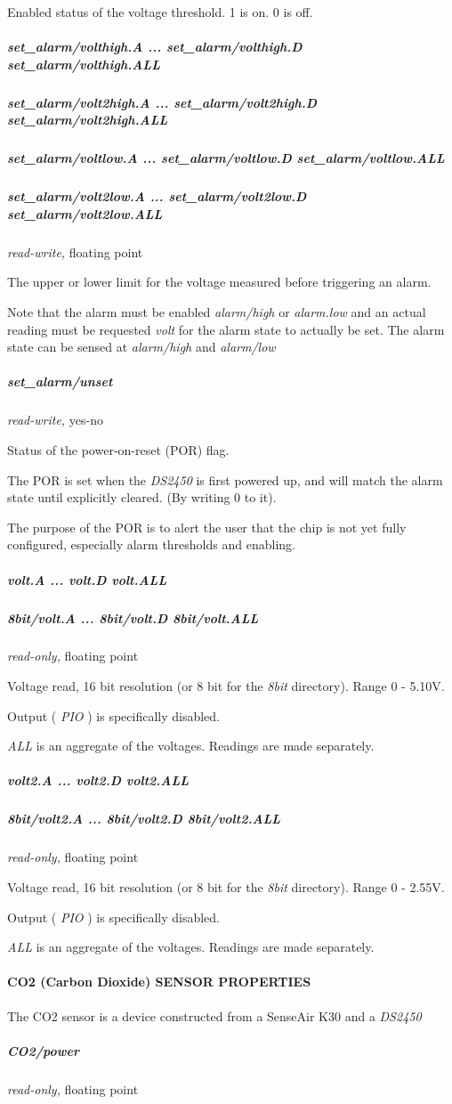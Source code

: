 Enabled status of the voltage threshold. 1 is on. 0 is off. 
\subparagraph*{set\_alarm/volthigh.A
... set\_alarm/volthigh.D set\_alarm/volthigh.ALL}
\subparagraph*{set\_alarm/volt2high.A ... set\_alarm/volt2high.D
set\_alarm/volt2high.ALL}
\subparagraph*{set\_alarm/voltlow.A ... set\_alarm/voltlow.D set\_alarm/voltlow.ALL}
\subparagraph*{set\_alarm/volt2low.A
... set\_alarm/volt2low.D set\_alarm/volt2low.ALL}\textit{read-write,} floating point 

The upper or lower limit for the voltage measured before triggering an
alarm. 

Note that the alarm must be enabled \textit{alarm/high} or \textit{alarm.low} and an actual
reading must be requested \textit{volt} for the alarm state to actually be set. The
alarm state can be sensed at \textit{alarm/high} and \textit{alarm/low} 
\subparagraph*{set\_alarm/unset}\textit{read-write,}
yes-no 

Status of the power-on-reset (POR) flag. 

The POR is set when the \textit{DS2450} is first powered up, and will match the
alarm state until explicitly cleared. (By writing 0 to it). 

The purpose of the POR is to alert the user that the chip is not yet fully
configured, especially alarm thresholds and enabling. 
\subparagraph*{volt.A ... volt.D volt.ALL}
\subparagraph*{8bit/volt.A
... 8bit/volt.D 8bit/volt.ALL}\textit{read-only,} floating point 

Voltage read, 16 bit resolution (or 8 bit for the  \textit{8bit} directory). Range
0 - 5.10V. 

Output ( \textit{PIO} ) is specifically disabled. 

\textit{ALL} is an aggregate of the voltages. Readings are made separately. 
\subparagraph*{volt2.A
... volt2.D volt2.ALL}
\subparagraph*{8bit/volt2.A ... 8bit/volt2.D 8bit/volt2.ALL}\textit{read-only,} floating
point 

Voltage read, 16 bit resolution (or 8 bit for the  \textit{8bit} directory). Range
0 - 2.55V. 

Output ( \textit{PIO} ) is specifically disabled. 

\textit{ALL} is an aggregate of the voltages. Readings are made separately. 
\paragraph*{CO2 (Carbon
Dioxide) SENSOR PROPERTIES}
The CO2 sensor is a device constructed from a
SenseAir K30 and a \textit{DS2450} 
\subparagraph*{CO2/power}\textit{read-only,} floating point 

